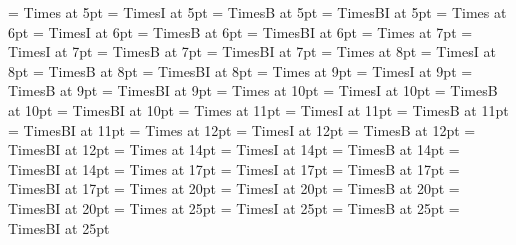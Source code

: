  \font\fivrm  = Times at 5pt               %
 \font\fivit  = TimesI at 5pt		  %
 \font\fivbf  = TimesB at 5pt		  %
 \font\fivbfs = TimesBI at 5pt		  %
 \font\sixrm  = Times at 6pt               %
 \font\sixit  = TimesI at 6pt		  %
 \font\sixbf  = TimesB at 6pt		  %
 \font\sixbfs = TimesBI at 6pt		  %
 \font\sevrm  = Times at 7pt               %
 \font\sevit  = TimesI at 7pt		  %
 \font\sevbf  = TimesB at 7pt		  %
 \font\sevbfs = TimesBI at 7pt		  %
 \font\egtrm  = Times at 8pt               %
 \font\egtit  = TimesI at 8pt		  %
 \font\egtbf  = TimesB at 8pt		  %
 \font\egtbfs = TimesBI at 8pt		  %
 \font\ninrm  = Times at 9pt               %
 \font\ninit  = TimesI at 9pt		  %
 \font\ninbf  = TimesB at 9pt		  %
 \font\ninbfs = TimesBI at 9pt		  %
 \font\tenrm  = Times at 10pt               %
 \font\tenit  = TimesI at 10pt		  %
 \font\tenbf  = TimesB at 10pt		  %
 \font\tenbfs = TimesBI at 10pt		  %
 \font\elvrm  = Times at 11pt               %
 \font\elvit  = TimesI at 11pt		  %
 \font\elvbf  = TimesB at 11pt		  %
 \font\elvbfs = TimesBI at 11pt		  %
 \font\twlrm  = Times at 12pt               %
 \font\twlit  = TimesI at 12pt		  %
 \font\twlbf  = TimesB at 12pt		  %
 \font\twlbfs = TimesBI at 12pt		  %
 \font\frtnrm  = Times at 14pt               %
 \font\frtnit  = TimesI at 14pt		  %
 \font\frtnbf  = TimesB at 14pt		  %
 \font\frtnbfs = TimesBI at 14pt		  %
 \font\svtnrm  = Times at 17pt               %
 \font\svtnit  = TimesI at 17pt		  %
 \font\svtnbf  = TimesB at 17pt		  %
 \font\svtnbfs = TimesBI at 17pt		  %
 \font\twtyrm  = Times at 20pt               %
 \font\twtyit  = TimesI at 20pt		  %
 \font\twtybf  = TimesB at 20pt		  %
 \font\twtybfs = TimesBI at 20pt		  %
 \font\twfvrm  = Times at 25pt               %
 \font\twfvit  = TimesI at 25pt		  %
 \font\twfvbf  = TimesB at 25pt		  %
 \font\twfvbfs = TimesBI at 25pt		  %
